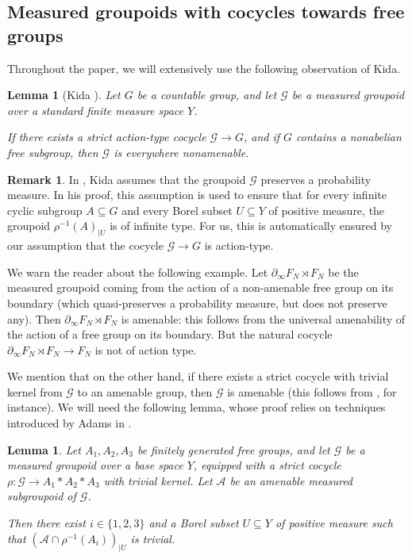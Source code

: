 \documentclass[JEP,XML,SOM,Unicode,NoFloatCountersInSection,published]{cedram}
\let\mathcal\mathscr
\theoremstyle{plain}
\newtheorem{lemma}[theo]{Lemma}
\theoremstyle{definition}
\newtheorem{rk}[theo]{Remark}
\newcommand{\cala}{\mathcal{A}}
\newcommand{\calg}{\mathcal{G}}
\begin{document}
\subsection{Measured groupoids with cocycles towards free groups}

Throughout the paper, we will extensively use the following observation of Kida.

\begin{lemma}[{Kida \cite[Lem.\,3.20]{Kid}}]\label{lemma:everywhere-nonamenable}
Let $G$ be a countable group, and let $\calg$ be a measured groupoid over a standard finite measure space $Y$.

If there exists a strict action-type cocycle $\calg\to G$, and if $G$ contains a nonabelian free subgroup, then $\calg$ is everywhere nonamenable.
\end{lemma}

\begin{rk}\label{rk:action-type}
In \cite[Lem.\,3.20]{Kid}, Kida assumes that the groupoid $\calg$ preserves a probability measure. In his proof, this assumption is used to ensure that for every infinite cyclic subgroup $A\subseteq G$ and every Borel subset $U\subseteq Y$ of positive measure, the groupoid $\rho^{-1}(A)_{|U}$ is of infinite type. For us, this is automatically ensured by our assumption that the cocycle $\calg\to G$ is action-type.

We warn the reader about the following example. Let $\partial_\infty F_N\rtimes F_N$ be the measured groupoid coming from the action of a non-amenable free group on its boundary (which quasi-preserves a probability measure, but does not preserve any). Then $\partial_\infty F_N\rtimes F_N$ is amenable: this follows from the universal amenability of the action of a free group on its boundary. But the natural cocycle $\partial_\infty F_N\rtimes F_N\to F_N$ is not of action type.
\end{rk}

We mention that on the other hand, if there exists a strict cocycle with trivial kernel from $\calg$ to an amenable group, then $\calg$ is amenable (this follows from \cite[Prop.\,4.33]{Kid-memoir}, for instance). We will need the following lemma, whose proof relies on techniques introduced by Adams in \cite{Ada}.

\begin{lemma}\label{lemma:free}
Let $A_1,A_2,A_3$ be finitely generated free groups, and let $\calg$ be a measured groupoid over a base space $Y$, equipped with a strict cocycle $\rho:\calg\to A_1\ast A_2\ast A_3$ with trivial kernel. Let $\cala$ be an amenable measured subgroupoid of $\calg$.

Then there exist $i\in\{1,2,3\}$ and a Borel subset $U\subseteq Y$ of positive measure such that $(\cala\cap \rho^{-1}(A_i))_{|U}$ is trivial.
\end{lemma}
\end{document}
